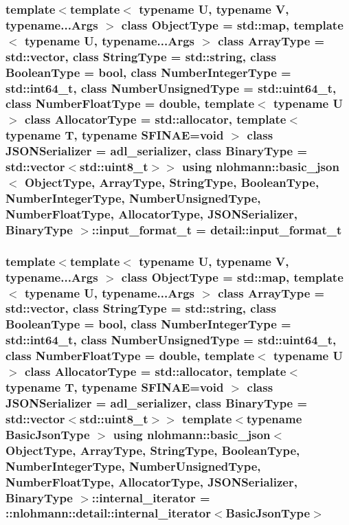 \subsubsection[{\texorpdfstring{input\+\_\+format\+\_\+t}{input_format_t}}]{\setlength{\rightskip}{0pt plus 5cm}template$<$template$<$ typename U, typename V, typename...\+Args $>$ class Object\+Type = std\+::map, template$<$ typename U, typename...\+Args $>$ class Array\+Type = std\+::vector, class String\+Type  = std\+::string, class Boolean\+Type  = bool, class Number\+Integer\+Type  = std\+::int64\+\_\+t, class Number\+Unsigned\+Type  = std\+::uint64\+\_\+t, class Number\+Float\+Type  = double, template$<$ typename U $>$ class Allocator\+Type = std\+::allocator, template$<$ typename T, typename S\+F\+I\+N\+A\+E=void $>$ class J\+S\+O\+N\+Serializer = adl\+\_\+serializer, class Binary\+Type  = std\+::vector$<$std\+::uint8\+\_\+t$>$$>$ using {\bf nlohmann\+::basic\+\_\+json}$<$ Object\+Type, Array\+Type, String\+Type, Boolean\+Type, Number\+Integer\+Type, Number\+Unsigned\+Type, Number\+Float\+Type, Allocator\+Type, J\+S\+O\+N\+Serializer, Binary\+Type $>$\+::{\bf input\+\_\+format\+\_\+t} =  {\bf detail\+::input\+\_\+format\+\_\+t}}\hypertarget{classnlohmann_1_1basic__json_a211cf53702226ad9fb3c939a3a3d3689}{}\label{classnlohmann_1_1basic__json_a211cf53702226ad9fb3c939a3a3d3689}
\subsubsection[{\texorpdfstring{internal\+\_\+iterator}{internal_iterator}}]{\setlength{\rightskip}{0pt plus 5cm}template$<$template$<$ typename U, typename V, typename...\+Args $>$ class Object\+Type = std\+::map, template$<$ typename U, typename...\+Args $>$ class Array\+Type = std\+::vector, class String\+Type  = std\+::string, class Boolean\+Type  = bool, class Number\+Integer\+Type  = std\+::int64\+\_\+t, class Number\+Unsigned\+Type  = std\+::uint64\+\_\+t, class Number\+Float\+Type  = double, template$<$ typename U $>$ class Allocator\+Type = std\+::allocator, template$<$ typename T, typename S\+F\+I\+N\+A\+E=void $>$ class J\+S\+O\+N\+Serializer = adl\+\_\+serializer, class Binary\+Type  = std\+::vector$<$std\+::uint8\+\_\+t$>$$>$ template$<$typename Basic\+Json\+Type $>$ using {\bf nlohmann\+::basic\+\_\+json}$<$ Object\+Type, Array\+Type, String\+Type, Boolean\+Type, Number\+Integer\+Type, Number\+Unsigned\+Type, Number\+Float\+Type, Allocator\+Type, J\+S\+O\+N\+Serializer, Binary\+Type $>$\+::{\bf internal\+\_\+iterator} =  \+::{\bf nlohmann\+::detail\+::internal\+\_\+iterator}$<$Basic\+Json\+Type$>$\hspace{0.3cm}{\ttfamily [private]}}\hypertarget{classnlohmann_1_1basic__json_abe6f1016de5097691cbfdbb989267718}{}\label{classnlohmann_1_1basic__json_abe6f1016de5097691cbfdbb989267718}
